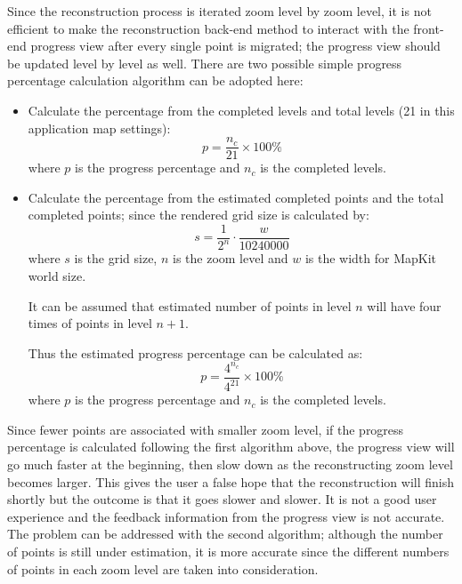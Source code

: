 \documentclass[12pt,a4paper]{article}
\begin{document}
            Since the reconstruction process is iterated zoom level by zoom level, it is not efficient to make the reconstruction back-end method to interact with the front-end progress view after every single point is migrated; the progress view should be updated level by level as well. There are two possible simple progress percentage calculation algorithm can be adopted here:
            \begin{itemize}
                \setlength\itemsep{-0.5em}
                \item Calculate the percentage from the completed levels and total levels (21 in this application map settings):
                \begin{equation*}
                    p = \frac{n_c}{21}\times100\%
                \end{equation*}
                where $p$ is the progress percentage and $n_c$ is the completed levels.
                \item Calculate the percentage from the estimated completed points and the total completed points; since the rendered grid size is calculated by:
                \begin{equation*}
                    s = \frac{1}{2^{n}}\cdot\frac{w}{10240000}
                \end{equation*}
                where $s$ is the grid size, $n$ is the zoom level and $w$ is the width for MapKit world size.
                
                It can be assumed that estimated number of points in level $n$ will have four times of points in level $n+1$.
                
                Thus the estimated progress percentage can be calculated as:
                \begin{equation*}
                    p = \frac{4^{n_c}}{4^{21}}\times100\%
                \end{equation*}
                where $p$ is the progress percentage and $n_c$ is the completed levels.
            \end{itemize}
            
            Since fewer points are associated with smaller zoom level, if the progress percentage is calculated following the first algorithm above, the progress view will go much faster at the beginning, then slow down as the reconstructing zoom level becomes larger. This gives the user a false hope that the reconstruction will finish shortly but the outcome is that it goes slower and slower. It is not a good user experience and the feedback information from the progress view is not accurate. The problem can be addressed with the second algorithm; although the number of points is still under estimation, it is more accurate since the different numbers of points in each zoom level are taken into consideration.
            
\end{document}
